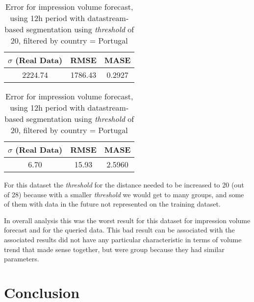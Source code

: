 \begin{table}[!ht]
\centering
\footnotesize
\begin{minipage}[t]{0.45\linewidth}
\centering
\footnotesize
\begin{tabular}{ccc}
 $\sigma$ (Real Data) & RMSE & MASE   \\ \hline
2224.74 & 1786.43 & 0.2927 \\
\end{tabular}

\vspace{0.5cm}

\caption[Volume
impression forecast, real data, datastream]{Error for impression volume
forecast, using 12h period with datastream-based segmentation using
\emph{threshold} of 20}
\label{tab:err_forecast_12_real_datastream_filtered}
\end{minipage}
\quad
\begin{minipage}[t]{0.45\linewidth}
\centering
\footnotesize
\begin{tabular}{ccc}
 $\sigma$ (Real Data) & RMSE & MASE   \\ \hline
6.70 & 15.93 & 2.5960 \\
\end{tabular}

\vspace{0.5cm}

\caption[Volume
impression forecast, real data, datastream, filtered]{Error for impression volume
forecast, using 12h period with datastream-based segmentation using
\emph{threshold} of 20, filtered by country = Portugal}
\label{tab:err_forecast_12_real_datastream_filtered}
\end{minipage}

\end{table}

For this dataset the \emph{threshold} for the distance needed to be increased to
20 (out of 28) because with a smaller \emph{threshold} we would get to many
groups, and some of them with data in the future not represented on the training
dataset.

In overall analysis this was the worst result for this dataset for impression
volume forecast and for the queried data. This bad result can be associated with
the associated results did not have any particular characteristic in terms of
volume trend that made sense together, but were group because they had similar
parameters.

\section{Conclusion}

